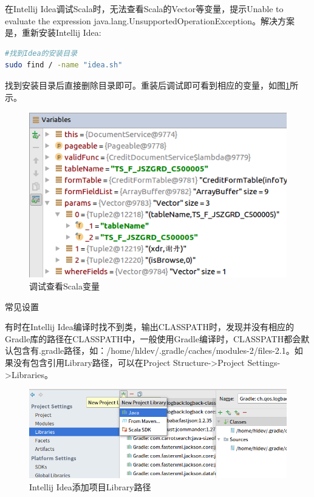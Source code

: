 \documentclass[12pt]{book}
\makeatletter
\numberwithin{dummy}{section}
\theoremstyle{ocrenumbox}
\theoremstyle{blacknumex}
\theoremstyle{blacknumbox}
\theoremstyle{ocrenum}
\renewcommand{\subsection}{\@startsection {subsection}{2}{\z@}
	{-3ex \@plus -0.1ex \@minus -.4ex}
	{0.5ex \@plus.2ex }
	{\normalfont\sffamily\bfseries}}
\makeatother
\begin{document}
在Intellij Idea调试Scala时，无法查看Scala的Vector等变量，提示Unable to evaluate the expression java.lang.UnsupportedOperationException。解决方案是，重新安装Intellij Idea:

\begin{lstlisting}[language=Bash]
#找到Idea的安装目录
sudo find / -name "idea.sh"
\end{lstlisting}

找到安装目录后直接删除目录即可。重装后调试即可看到相应的变量，如图\ref{fig:probescalavariable}所示。

\begin{figure}[htbp]
	\centering
	\includegraphics[scale=0.5]{probescalavariable.png}
	\caption{调试查看Scala变量}
	\label{fig:probescalavariable}
\end{figure}


\subsection{常见设置}

有时在Intellij Idea编译时找不到类，输出CLASSPATH时，发现并没有相应的Gradle库的路径在CLASSPATH中，一般使用Gradle编译时，CLASSPATH都会默认包含有.gradle路径，如：/home/hldev/.gradle/caches/modules-2/files-2.1。如果没有包含引用Library路径，可以在Project Structure->Project Settings->Libraries。

\begin{figure}[htbp]
	\centering
	\includegraphics[scale=0.45]{intellijideaaddlibraries.png}
	\caption{Intellij Idea添加项目Library路径}
	\label{fig:intellijideaaddlibraries}
\end{figure}
\end{document}
